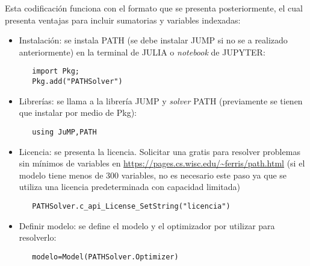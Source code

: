 Esta codificación funciona con el formato que se presenta posteriormente, el cual presenta ventajas para incluir sumatorias y variables indexadas: 

\begin{itemize}
 
\item Instalación: se instala PATH (se debe instalar JUMP si no se a realizado anteriormente) en la terminal de JULIA o \textit{notebook} de JUPYTER:\\

\begin{footnotesize}
   \begin{lstlisting}
   import Pkg;
   Pkg.add("PATHSolver")
   \end{lstlisting}
   \end{footnotesize}


\item Librerías: se llama a la librería JUMP y \textit{solver} PATH (previamente se tienen que instalar por medio de Pkg):
   
   \begin{footnotesize}
   \begin{lstlisting}
   using JuMP,PATH
   \end{lstlisting}
   \end{footnotesize}
   
    \item Licencia: se presenta la licencia. Solicitar una gratis para resolver problemas sin mínimos de variables en \url{https://pages.cs.wisc.edu/~ferris/path.html} (si el modelo tiene menos de 300 variables, no es necesario este paso ya que se utiliza una licencia predeterminada con capacidad limitada)
    \begin{footnotesize}
   \begin{lstlisting}
   PATHSolver.c_api_License_SetString("licencia")
   \end{lstlisting}
   \end{footnotesize}
    
   \item Definir modelo: se define el modelo y el optimizador por utilizar para resolverlo:
   
   \begin{footnotesize}
   \begin{lstlisting}
   modelo=Model(PATHSolver.Optimizer)
   \end{lstlisting}
   \end{footnotesize}
   

\end{itemize}
